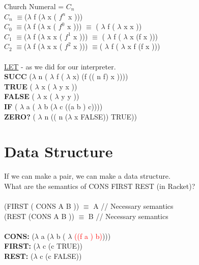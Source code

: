 \documentclass{article}
\begin{document}
Church Numeral = $C_n$\\
$C_n$ $\equiv$($\lambda$ f ($\lambda$ x ( $f^{n}$ x )))\\
$C_0$ $\equiv$($\lambda$ f ($\lambda$ x ( $f^{0}$ x )))  $\equiv$ ( $\lambda$ f ( $\lambda$ x x )) \\
$C_1$ $\equiv$($\lambda$ f ($\lambda$ x x ( $f^{1}$ x )))  $\equiv$ ( $\lambda$ f ( $\lambda$ x (f x ))) \\
$C_2$ $\equiv$($\lambda$ f ($\lambda$ x x ( $f^{2}$ x )))  $\equiv$( $\lambda$ f ( $\lambda$ x f (f x ))) \\
\doublespacing\\
\underline{LET} - as we did for our interpreter.\\
\textbf{SUCC} ($\lambda$ n ( $\lambda$ f ( $\lambda$ x) (f (( n f) x ))))\\
\textbf{TRUE} ( $\lambda$ x ( $\lambda$ y x ))\\
\textbf{FALSE} ( $\lambda$ x ( $\lambda$ y y ))\\
\textbf{IF} ( $\lambda$ a ( $\lambda$ b ($\lambda$ c ((a b ) c))))\\
\textbf{ZERO?} ( $\lambda$ n (( n ($\lambda$ x FALSE)) TRUE))\\


\section{Data Structure}

If we can make a pair, we can make a data structure.\\
What are the semantics of CONS FIRST REST (in Racket)?\\
\doublespacing\\
\hspace{3mm} (FIRST ( CONS A B )) $\equiv$ A // Necessary semantics\\
\hspace{3mm} (REST (CONS A B ))  $\equiv$ B // Necessary semantics\\
\doublespacing\\
\textbf{CONS:} ($\lambda$ a ($\lambda$ b ( $\lambda$ \textcolor{red}{((f a ) b)})))\\
\textbf{FIRST:} ($\lambda$ c (c TRUE))\\
\textbf{REST:} ($\lambda$ c (c FALSE))\\
\end{document}
